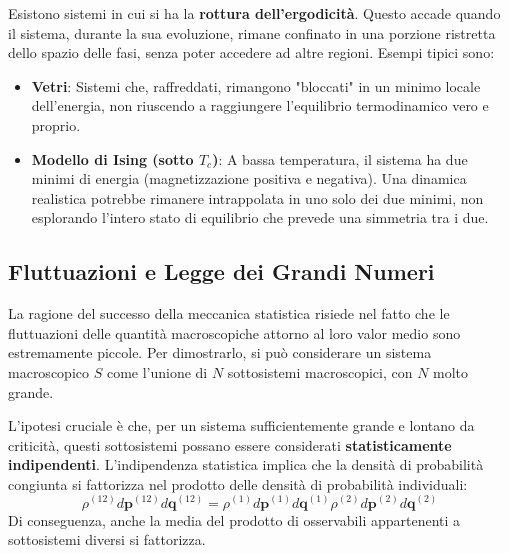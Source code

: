 Esistono sistemi in cui si ha la \textbf{rottura dell'ergodicità}. Questo accade quando il sistema, durante la sua evoluzione, rimane confinato in una porzione ristretta dello spazio delle fasi, senza poter accedere ad altre regioni. Esempi tipici sono:
\begin{itemize}
    \item \textbf{Vetri}: Sistemi che, raffreddati, rimangono "bloccati" in un minimo locale dell'energia, non riuscendo a raggiungere l'equilibrio termodinamico vero e proprio.
    \item \textbf{Modello di Ising (sotto $T_c$)}: A bassa temperatura, il sistema ha due minimi di energia (magnetizzazione positiva e negativa). Una dinamica realistica potrebbe rimanere intrappolata in uno solo dei due minimi, non esplorando l'intero stato di equilibrio che prevede una simmetria tra i due.
\end{itemize}

\subsection*{Fluttuazioni e Legge dei Grandi Numeri}

La ragione del successo della meccanica statistica risiede nel fatto che le fluttuazioni delle quantità macroscopiche attorno al loro valor medio sono estremamente piccole. Per dimostrarlo, si può considerare un sistema macroscopico $S$ come l'unione di $N$ sottosistemi macroscopici, con $N$ molto grande.

L'ipotesi cruciale è che, per un sistema sufficientemente grande e lontano da criticità, questi sottosistemi possano essere considerati \textbf{statisticamente indipendenti}. L'indipendenza statistica implica che la densità di probabilità congiunta si fattorizza nel prodotto delle densità di probabilità individuali:
\begin{equation}
    \rho^{(12)}d{\mathbf{p}}^{(12)}d\mathbf{q}^{(12)}=\rho^{(1)}d{\mathbf{p}}^{(1)}d\mathbf{q}^{(1)}\rho^{(2)}d{\mathbf{p}}^{(2)}d\mathbf{q}^{(2)}
    \label{eq:indip_stat}
\end{equation}
Di conseguenza, anche la media del prodotto di osservabili appartenenti a sottosistemi diversi si fattorizza.

